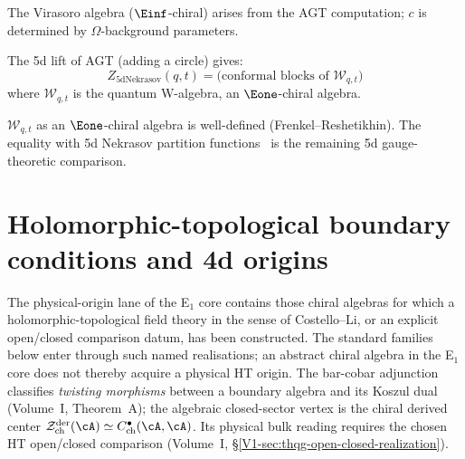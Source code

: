 \begin{corollary}\label{cor:virasoro-gauge}
The Virasoro algebra ($\Einf$-chiral) arises from the AGT computation; $c$ is determined by $\Omega$-background parameters.
\end{corollary}


\begin{remark}\label{rem:q-agt}
The 5d lift of AGT (adding a circle) gives:
\[
Z_{\mathrm{5d Nekrasov}}(q, t) = \text{(conformal blocks of } \mathcal{W}_{q,t})
\]
where $\mathcal{W}_{q,t}$ is the quantum W-algebra, an $\Eone$-chiral algebra.
\end{remark}

\begin{remark}
$\mathcal{W}_{q,t}$ as an $\Eone$-chiral algebra is well-defined
(Frenkel--Reshetikhin). The equality with 5d Nekrasov partition
functions~\cite{AY10} is the remaining 5d gauge-theoretic comparison.
\end{remark}


\section{Holomorphic-topological boundary conditions and 4d origins}
\label{sec:ht-boundary-physical-origins}


The physical-origin lane of the E$_1$ core contains those chiral
algebras for which a holomorphic-topological field theory in the sense
of Costello--Li, or an explicit open/closed comparison datum, has been
constructed.  The standard families below enter through such named
realisations; an abstract chiral algebra in the E$_1$ core does not
thereby acquire a physical HT origin.
The bar-cobar adjunction classifies \emph{twisting morphisms}
between a boundary algebra and its Koszul dual (Volume~I, Theorem~A);
the algebraic closed-sector vertex is the chiral derived center
$\mathcal{Z}^{\mathrm{der}}_{\mathrm{ch}}(\cA)
\simeq C^\bullet_{\mathrm{ch}}(\cA,\cA)$.  Its physical bulk reading
requires the chosen HT open/closed comparison
(Volume~I, \S\ref*{V1-sec:thqg-open-closed-realization}).

